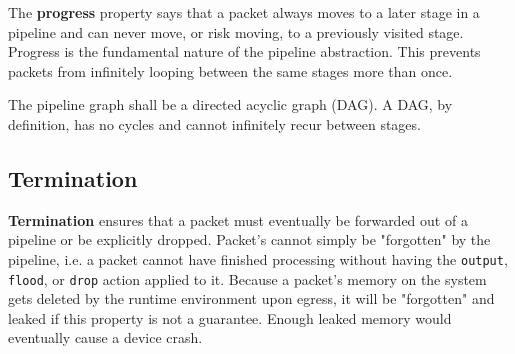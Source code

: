 The \textbf{progress} property says that a packet always moves to a later stage in a pipeline and can never move, or risk moving, to a previously visited stage. Progress is the fundamental nature of the pipeline abstraction. This prevents packets from infinitely looping between the same stages more than once.

The pipeline graph shall be a directed acyclic graph (DAG). A DAG, by definition, has no cycles and cannot infinitely recur between stages.

%
%

\subsection{Termination} \label{termination_guide}

\textbf{Termination} ensures that a packet must eventually be forwarded out of a pipeline or be explicitly dropped. Packet's cannot simply be "forgotten" by the pipeline, i.e. a packet cannot have finished processing without having the \texttt{output}, \texttt{flood}, or \texttt{drop} action applied to it. Because a packet's memory on the system gets deleted by the runtime environment upon egress, it will be "forgotten" and leaked if this property is not a guarantee. Enough leaked memory would eventually cause a device crash.

